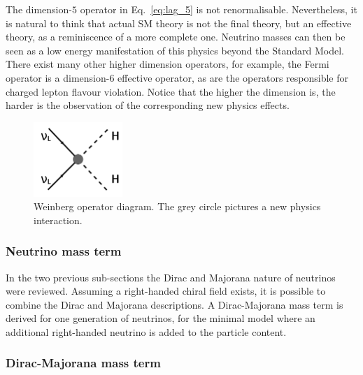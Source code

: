 The dimension-$5$ operator in Eq.~\eqref{eq:lag_5} is not renormalisable.
Nevertheless, it is natural to think that actual SM theory is not the final theory, but an effective theory, as a reminiscence of a more complete one.
Neutrino masses can then be seen as a low energy manifestation of this physics beyond the Standard Model.
There exist many other higher dimension operators, for example, the Fermi operator is a dimension-6 effective operator, as are the operators responsible for charged lepton flavour violation.
Notice that the higher the dimension is, the harder is the observation of the corresponding new physics effects.
\begin{figure}[h!]
  \centering
  \includegraphics[width=0.3\textwidth]{neutrinophysics/fig_neutrinophysics/Weinberg_diagram.pdf}
  \caption{Weinberg operator diagram.
    The grey circle pictures a new physics interaction.
    \label{fig:weinberg_diagram}}
\end{figure}


\subsubsection{Neutrino mass term}

In the two previous sub-sections the Dirac and Majorana nature of neutrinos were reviewed.
Assuming a right-handed chiral field exists, it is possible to combine the Dirac and Majorana descriptions.
A Dirac-Majorana mass term is derived for one generation of neutrinos, for the minimal model where an additional right-handed neutrino is added to the particle content.


\subsubsection*{Dirac-Majorana mass term}


